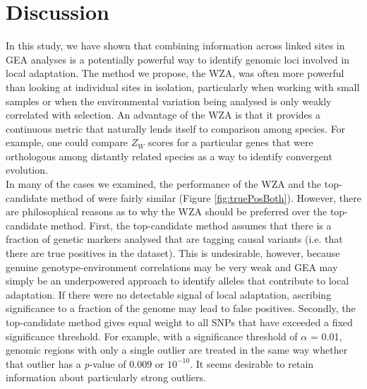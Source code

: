 \documentclass[10pt,twoside,lineno, twocolumn]{GSA_format}
\begin{document}

\section{Discussion}

In this study, we have shown that combining information across linked sites in GEA analyses is a potentially powerful way to identify genomic loci involved in local adaptation. The method we propose, the WZA, was often more powerful than looking at individual sites in isolation, particularly when working with small samples or when the environmental variation being analysed is only weakly correlated with selection. An advantage of the WZA is that it provides a continuous metric that naturally lends itself to comparison among species. For example, one could compare $Z_W$ scores for a particular genes that were orthologous among distantly related species as a way to identify convergent evolution.  \\

In many of the cases we examined, the performance of the WZA and the top-candidate method of \cite{Yeaman2016} were fairly similar (Figure \ref{fig:truePosBoth}). However, there are philosophical reasons as to why the WZA should be preferred over the top-candidate method. First, the top-candidate method assumes that there is a fraction of genetic markers analysed that are tagging causal variants (i.e. that there are true positives in the dataset). This is undesirable, however, because genuine genotype-environment correlations may be very weak and GEA may simply be an underpowered approach to identify alleles that contribute to local adaptation. If there were no detectable signal of local adaptation, ascribing significance to a fraction of the genome may lead to false positives. Secondly, the top-candidate method gives equal weight to all SNPs that have exceeded a fixed significance threshold. For example, with a significance threshold of \textit{$\alpha$} = 0.01, genomic regions with only a single outlier are treated in the same way whether that outlier has a \textit{p}-value of 0.009 or $10^{-10}$. It seems desirable to retain information about particularly strong outliers. \\
\end{document}
